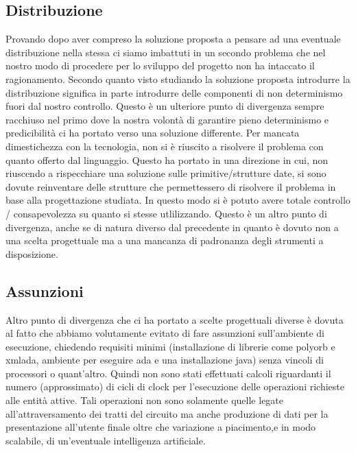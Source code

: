 \subsection{Distribuzione}
Provando dopo aver compreso la soluzione proposta a pensare ad una eventuale distribuzione nella stessa ci siamo imbattuti in un secondo problema che nel nostro modo di procedere per lo sviluppo del progetto non ha intaccato il ragionamento. Secondo quanto visto studiando la soluzione proposta introdurre la distribuzione significa in parte introdurre delle componenti di non determinismo fuori dal nostro controllo. Questo è un ulteriore punto di divergenza sempre racchiuso nel primo dove la nostra volontà di garantire pieno determinismo e predicibilità ci ha portato verso una soluzione differente.
                  Per mancata dimestichezza con la tecnologia, non si è riuscito a risolvere il problema con quanto offerto dal linguaggio. Questo ha portato in una direzione in cui, non riuscendo a rispecchiare una soluzione sulle primitive/strutture date, si sono dovute reinventare delle strutture che permettessero di risolvere il problema in base alla progettazione studiata. In questo modo si è potuto avere totale controllo / consapevolezza su quanto si stesse utlilizzando. Questo è un altro punto di divergenza, anche se di natura diverso dal precedente in quanto è dovuto non a una scelta progettuale ma a una mancanza di padronanza degli strumenti a disposizione.
\subsection{Assunzioni}
Altro punto di divergenza che ci ha portato a scelte progettuali diverse è dovuta al fatto che abbiamo volutamente evitato di fare assunzioni sull'ambiente di esecuzione, chiedendo requisiti minimi (installazione di librerie come polyorb e xmlada, ambiente per eseguire ada e una installazione java) senza vincoli di processori o quant'altro. Quindi non sono stati effettuati calcoli riguardanti il numero (approssimato) di cicli di clock per l'esecuzione delle operazioni richieste alle entità attive. Tali operazioni non sono solamente quelle legate all’attraversamento dei tratti del circuito ma anche produzione di dati per la presentazione all'utente finale oltre che variazione a piacimento,e in modo scalabile, di un'eventuale intelligenza artificiale.
